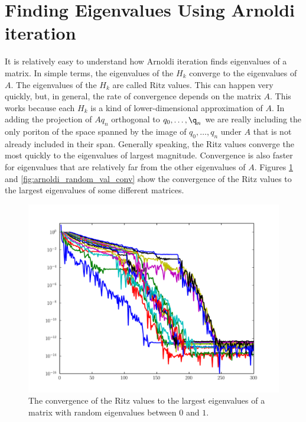 
\section*{Finding Eigenvalues Using Arnoldi iteration}

It is relatively easy to understand how Arnoldi iteration finds eigenvalues of a matrix.
In simple terms, the eigenvalues of the $H_k$ converge to the eigenvalues of $A$.
The eigenvalues of the $H_k$ are called Ritz values.
This can happen very quickly, but, in general, the rate of convergence depends on the matrix $A$.
This works because each $H_k$ is a kind of lower-dimensional approximation of $A$.
In adding the projection of $A q_n$ orthogonal to $q_0, \dots, \q_n$ we are really including the only poriton of the space spanned by the image of $q_0, \dots, q_n$ under $A$ that is not already included in their span.
Generally speaking, the Ritz values converge the most quickly to the eigenvalues of largest magnitude.
Convergence is also faster for eigenvalues that are relatively far from the other eigenvalues of $A$.
Figures \ref{fig:arnoldi_random_eig_conv} and \ref{fig:arnoldi_random_val_conv} show the convergence of the Ritz values to the largest eigenvalues of some different matrices.

\begin{figure}
\includegraphics[width=\textwidth]{rand_eigs_conv.pdf}
\caption{The convergence of the Ritz values to the largest eigenvalues of a matrix with random eigenvalues between $0$ and $1$.}
\label{fig:arnoldi_random_eig_conv}
\end{figure}

